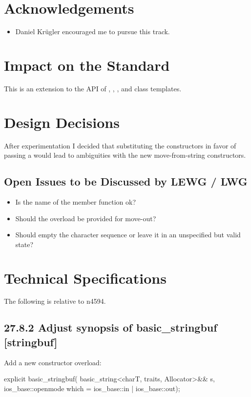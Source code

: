 \documentclass[ebook,11pt,article]{memoir}
\begin{document}
\chapter{Acknowledgements}
\begin{itemize}
\item Daniel Kr\"ugler encouraged me to pursue this track.
\end{itemize}




\chapter{Impact on the Standard}
This is an extension to the API of , , , and  class templates.
\chapter{Design Decisions}
After experimentation I decided that substituting the  constructors in favor of passing a  would lead to ambiguities with the new move-from-string constructors.
\section{Open Issues to be Discussed by LEWG / LWG}
\begin{itemize}
\item Is the name of the  member function ok?
\item Should the  overload be provided for move-out?
\item Should  empty the character sequence or leave it in an unspecified but valid state?
\end{itemize}

\chapter{Technical Specifications}
The following is relative to n4594.
\section{27.8.2 Adjust synopsis of basic\_stringbuf [stringbuf]}
Add a new constructor overload:
\begin{insrt}
\begin{codeblock}
      explicit basic_stringbuf(
        basic_string<charT, traits, Allocator>&& s,
        ios_base::openmode which = ios_base::in | ios_base::out);
\end{codeblock}
\end{insrt}
\end{document}
